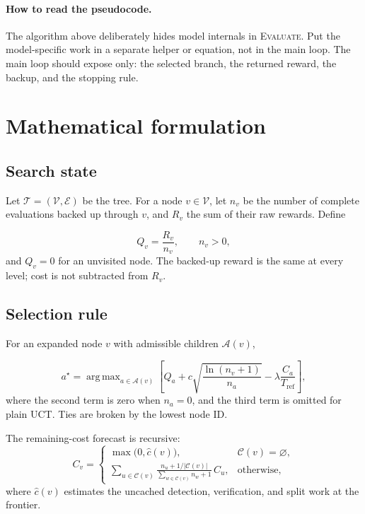 \documentclass[11pt]{article}
\DeclareMathOperator*{\argmax}{arg\,max}
\newcommand{\set}[1]{\mathcal{#1}}
\begin{document}
\paragraph{How to read the pseudocode.}
The algorithm above deliberately hides model internals in \textsc{Evaluate}.
Put the model-specific work in a separate helper or equation, not in the main
loop. The main loop should expose only: the selected branch, the returned reward,
the backup, and the stopping rule.

\section{Mathematical formulation}

\subsection{Search state}

Let $\set{T} = (\set{V}, \set{E})$ be the tree. For a node $v \in \set{V}$,
let $n_v$ be the number of complete evaluations backed up through $v$, and
$R_v$ the sum of their raw rewards. Define

\begin{equation}
  Q_v = \frac{R_v}{n_v}, \qquad n_v > 0,
  \label{eq:quality}
\end{equation}
and $Q_v = 0$ for an unvisited node. The backed-up reward is the same at every
level; cost is not subtracted from $R_v$.

\subsection{Selection rule}

For an expanded node $v$ with admissible children $\set{A}(v)$,

\begin{equation}
  a^\star
  = \argmax_{a \in \set{A}(v)}
    \left[
      Q_a
      + c \sqrt{\frac{\ln(n_v + 1)}{n_a}}
      - \lambda \frac{C_a}{T_{\mathrm{ref}}}
    \right],
  \label{eq:selection}
\end{equation}
where the second term is zero when $n_a = 0$, and the third term is omitted for
plain UCT. Ties are broken by the lowest node ID.

The remaining-cost forecast is recursive:
\begin{equation}
  C_v =
  \begin{cases}
    \max\bigl(0, \hat{c}(v)\bigr), & \set{C}(v) = \varnothing, \\[4pt]
    \displaystyle
    \sum_{u \in \set{C}(v)}
      \frac{n_u + 1/|\set{C}(v)|}
           {\sum_{w \in \set{C}(v)} n_w + 1}
      \, C_u, & \text{otherwise},
  \end{cases}
  \label{eq:cost}
\end{equation}
where $\hat{c}(v)$ estimates the uncached detection, verification, and split
work at the frontier.
\end{document}
